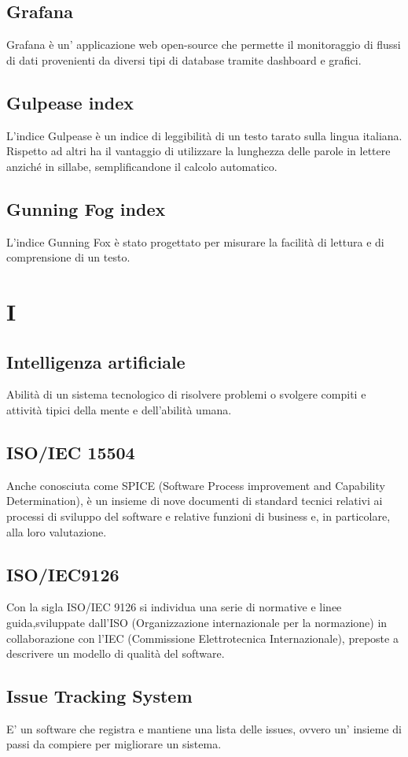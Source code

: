     \subsection*{Grafana}
Grafana è un’ applicazione web open-source che permette il monitoraggio di flussi di dati provenienti da diversi tipi di database tramite dashboard e grafici.
    \subsection*{Gulpease index}
L’indice Gulpease è un indice di leggibilità di un testo tarato sulla lingua italiana.  Rispetto ad altri ha il vantaggio di utilizzare la lunghezza delle parole in lettere anziché in sillabe, semplificandone il calcolo automatico.
    \subsection*{Gunning Fog index}
L’indice Gunning Fox è stato progettato per misurare la facilità di lettura e di comprensione di un testo.
\newpage
    
\section{I}
    \subsection*{Intelligenza artificiale}
Abilità di un sistema tecnologico di risolvere problemi o svolgere compiti e attività tipici della mente e dell’abilità umana.
    \subsection*{ISO/IEC 15504}
Anche conosciuta come SPICE (Software Process improvement and Capability Determination), è un insieme di nove documenti di standard tecnici relativi ai processi di sviluppo del software e relative funzioni di business e, in particolare, alla loro valutazione.
    \subsection*{ISO/IEC9126}
Con la sigla ISO/IEC 9126 si individua una serie di normative e linee guida,sviluppate dall’ISO (Organizzazione internazionale per la normazione) in collaborazione con l’IEC (Commissione Elettrotecnica Internazionale), preposte a descrivere un modello di qualità del software.
    \subsection*{Issue Tracking System}
E’ un software che registra e mantiene una lista delle issues, ovvero un’ insieme di passi da compiere per migliorare un sistema.
\newpage
    
